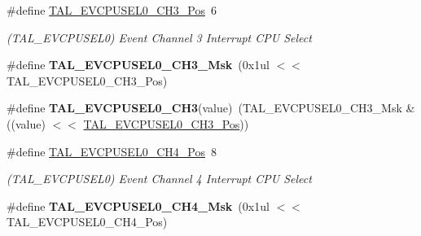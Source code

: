 \begin{DoxyCompactItemize}
\item 
\hypertarget{group___s_a_m_l21___t_a_l_ga60fbda68a92557fb16591254f0c33971}{}\#define \hyperlink{group___s_a_m_l21___t_a_l_ga60fbda68a92557fb16591254f0c33971}{T\+A\+L\+\_\+\+E\+V\+C\+P\+U\+S\+E\+L0\+\_\+\+C\+H3\+\_\+\+Pos}~6\label{group___s_a_m_l21___t_a_l_ga60fbda68a92557fb16591254f0c33971}

\begin{DoxyCompactList}\small\item\em (T\+A\+L\+\_\+\+E\+V\+C\+P\+U\+S\+E\+L0) Event Channel 3 Interrupt C\+P\+U Select \end{DoxyCompactList}\item 
\hypertarget{group___s_a_m_l21___t_a_l_gad09caf9cf3f7e81a6efbcef50623c401}{}\#define {\bfseries T\+A\+L\+\_\+\+E\+V\+C\+P\+U\+S\+E\+L0\+\_\+\+C\+H3\+\_\+\+Msk}~(0x1ul $<$$<$ T\+A\+L\+\_\+\+E\+V\+C\+P\+U\+S\+E\+L0\+\_\+\+C\+H3\+\_\+\+Pos)\label{group___s_a_m_l21___t_a_l_gad09caf9cf3f7e81a6efbcef50623c401}

\item 
\hypertarget{group___s_a_m_l21___t_a_l_gaf37875c7bb748a3fd949a596ec8d1b4e}{}\#define {\bfseries T\+A\+L\+\_\+\+E\+V\+C\+P\+U\+S\+E\+L0\+\_\+\+C\+H3}(value)~(T\+A\+L\+\_\+\+E\+V\+C\+P\+U\+S\+E\+L0\+\_\+\+C\+H3\+\_\+\+Msk \& ((value) $<$$<$ \hyperlink{group___s_a_m_l21___t_a_l_ga60fbda68a92557fb16591254f0c33971}{T\+A\+L\+\_\+\+E\+V\+C\+P\+U\+S\+E\+L0\+\_\+\+C\+H3\+\_\+\+Pos}))\label{group___s_a_m_l21___t_a_l_gaf37875c7bb748a3fd949a596ec8d1b4e}

\item 
\hypertarget{group___s_a_m_l21___t_a_l_ga68583ceefef14985b7331eb1c2c1e353}{}\#define \hyperlink{group___s_a_m_l21___t_a_l_ga68583ceefef14985b7331eb1c2c1e353}{T\+A\+L\+\_\+\+E\+V\+C\+P\+U\+S\+E\+L0\+\_\+\+C\+H4\+\_\+\+Pos}~8\label{group___s_a_m_l21___t_a_l_ga68583ceefef14985b7331eb1c2c1e353}

\begin{DoxyCompactList}\small\item\em (T\+A\+L\+\_\+\+E\+V\+C\+P\+U\+S\+E\+L0) Event Channel 4 Interrupt C\+P\+U Select \end{DoxyCompactList}\item 
\hypertarget{group___s_a_m_l21___t_a_l_ga07e56b9e93347fb2cc09ad2107a0e8ff}{}\#define {\bfseries T\+A\+L\+\_\+\+E\+V\+C\+P\+U\+S\+E\+L0\+\_\+\+C\+H4\+\_\+\+Msk}~(0x1ul $<$$<$ T\+A\+L\+\_\+\+E\+V\+C\+P\+U\+S\+E\+L0\+\_\+\+C\+H4\+\_\+\+Pos)\label{group___s_a_m_l21___t_a_l_ga07e56b9e93347fb2cc09ad2107a0e8ff}


\end{DoxyCompactItemize}
